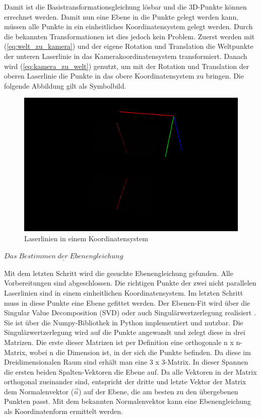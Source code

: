 		Damit ist die Basistransformationsgleichung lösbar und die 3D-Punkte können errechnet werden. Damit nun eine Ebene in die Punkte gelegt werden kann, müssen alle Punkte in ein einheitliches Koordinatensystem gelegt werden. Durch die bekannten Transformationen ist dies jedoch kein Problem. Zuerst werden mit (\ref{eq:welt_zu_kamera}) und der eigene Rotation und Translation die Weltpunkte der unteren Laserlinie in das Kamerakoordinatensystem transformiert. Danach wird (\ref{eq:kamera_zu_welt}) genutzt, um mit der Rotation und Translation der oberen Laserlinie die Punkte in das obere Koordinatensystem zu bringen. Die folgende Abbildung gilt als Symbolbild.
	
		\begin{figure}[h]
			\centering
			\includegraphics[width=0.85\linewidth]{img/hauptteil/ext-calib/laserline_together.png}
			\caption{Laserlinien in einem Koordinatensystem}
			\label{fig:ext-calib-laserlines-together}
		\end{figure}
	
		$\underline{Das \; Bestimmen \; der \; Ebenengleichung}$
		
		Mit dem letzten Schritt wird die gesuchte Ebenengleichung gefunden. Alle Vorbereitungen sind abgeschlossen. Die richtigen Punkte der zwei nicht parallelen Laserlinien sind in einem einheitlichen Koordinatensystem. Im letzten Schritt muss in diese Punkte eine Ebene gefittet werden. Der Ebenen-Fit wird über die Singular Value Decomposition (SVD) oder auch Singulärwertzerlegung realisiert \citep[Vgl. S. 349 ff]{liesen_lineare_2021}. Sie ist über die Numpy-Bibliothek in Python implementiert und nutzbar. Die Singulärwertzerlegung wird auf die Punkte angewandt und zelegt diese in drei Matrizen. Die erste dieser Matrizen ist per Definition eine orthogonale n x n-Matrix, wobei n die Dimension ist, in der sich die Punkte befinden. Da diese im Dreidimensionalen Raum sind erhält man eine 3 x 3-Matrix. In dieser Spannen die ersten beiden Spalten-Vektoren die Ebene auf. Da alle Vektoren in der Matrix orthogonal zueinander sind, entspricht der dritte und letzte Vektor der Matrix dem Normalenvektor ($ \vec{n} $) auf der Ebene, die am besten zu den übergebenen Punkten passt. Mit dem bekannten Normalenvektor kann eine Ebenengleichung als Koordinatenform ermittelt werden. 
		
